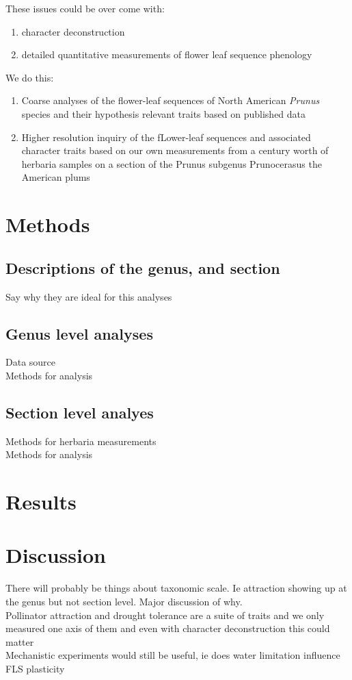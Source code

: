 \documentclass{article}\usepackage[]{graphicx}\usepackage[]{color}
\begin{document}
These issues could be over come with:
\begin{enumerate}
\item character deconstruction
\item detailed quantitative measurements of flower leaf sequence phenology
\end{enumerate}

We do this:
\begin{enumerate}
\item Coarse analyses of the flower-leaf sequences of North American \textit{Prunus} species and their hypothesis relevant traits based on published data
\item Higher resolution inquiry of the fLower-leaf sequences and associated character traits based on our own measurements from a century worth of herbaria samples on a section of the Prunus subgenus Prunocerasus the American plums
\end{enumerate}

\section*{Methods}
\subsection{Descriptions of the genus, and section}
Say why they are ideal for this analyses
\subsection{Genus level analyses}
Data source\\
Methods for analysis\\

\subsection{Section level analyes}
Methods for herbaria measurements\\
Methods for analysis\\
\pagebreak

\section*{Results}

\section*{Discussion}
There will probably be things about taxonomic scale. Ie attraction showing up at the genus but not section level. Major discussion of why. \\
Pollinator attraction and drought tolerance are a suite of traits and we only measured one axis of them and even with character deconstruction this could matter\\
Mechanistic experiments would still be useful, ie does water limitation influence FLS plasticity
\newpage
\end{document}
